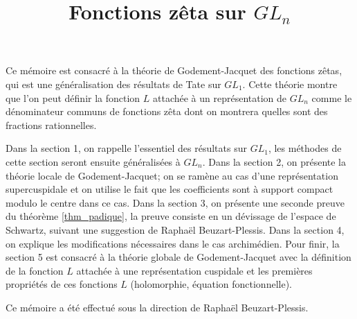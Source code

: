 \documentclass{amsart}
\begin{document}
\title{Fonctions zêta sur $GL_n$}
\maketitle

Ce mémoire est consacré à la théorie de Godement-Jacquet \cite{godement-jacquet} des fonctions zêtas, qui est une généralisation des résultats de Tate \cite{tate} sur $GL_1$. Cette théorie montre que l'on peut définir la fonction $L$ attachée à un représentation de $GL_n$ comme le dénominateur communs de fonctions zêta dont on montrera quelles sont des fractions rationnelles.

Dans la section 1, on rappelle l'essentiel des résultats sur $GL_1$, les méthodes de cette section seront ensuite généralisées à $GL_n$. Dans la section 2, on présente la théorie locale de Godement-Jacquet; on se ramène au cas d'une représentation supercuspidale et on utilise le fait que les coefficients sont à support compact modulo le centre dans ce cas. Dans la section 3, on présente une seconde preuve du théorème \ref{thm_padique}, la preuve consiste en un dévissage de l'espace de Schwartz, suivant une suggestion de Raphaël Beuzart-Plessis. Dans la section 4, on explique les modifications nécessaires dans le cas archimédien. Pour finir, la section 5 est consacré à la théorie globale de Godement-Jacquet avec la définition de la fonction $L$ attachée à une représentation cuspidale et les premières propriétés de ces fonctions $L$ (holomorphie, équation fonctionnelle).

Ce mémoire a été effectué sous la direction de Raphaël Beuzart-Plessis.

\tableofcontents











 
\end{document}

